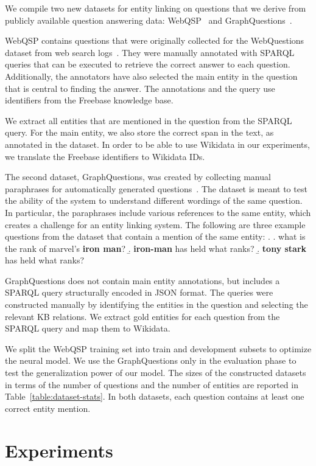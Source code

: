 \documentclass[11pt,a4paper]{article}
\begin{document}
We compile two new datasets for entity linking on questions that we derive from publicly available question answering data: WebQSP~\cite{Yih2016} and GraphQuestions~\cite{Su2016}.

WebQSP contains questions that were originally collected for the WebQuestions dataset from web search logs~\cite{Berant2013}. They were manually annotated with SPARQL queries that can be executed to retrieve the correct answer to each question. Additionally, the annotators have also selected the main entity in the question that is central to finding the answer. The annotations and the query use identifiers from the Freebase knowledge base.

We extract all entities that are mentioned in the question from the SPARQL query. For the main entity, we also store the correct span in the text, as annotated in the dataset. In order to be able to use Wikidata in our experiments, we translate the Freebase identifiers to Wikidata IDs.

The second dataset, GraphQuestions, was created by collecting manual paraphrases for automatically generated questions~\cite{Su2016}. The dataset is meant to test the ability of the system to understand different wordings of the same question. In particular, the paraphrases include various references to the same entity, which creates a challenge for an entity linking system. 
 The following are three example questions from the dataset that contain a mention of the same entity:
 \ex. \a. \label{ex:graphquestions} what is the rank of marvel's \textbf{iron man}?
 \b. \textbf{iron-man} has held what ranks?
 \b. \textbf{tony stark} has held what ranks?


GraphQuestions does not contain main entity annotations, but includes a SPARQL query structurally encoded in JSON format. The queries were constructed manually by identifying the entities in the question and selecting the relevant KB relations.  We extract gold entities for each question from the SPARQL query and map them to Wikidata. 

We split the WebQSP training set into train and development subsets to optimize the neural model. We use the GraphQuestions only in the evaluation phase to test the generalization power of our model. 
The sizes of the constructed datasets in terms of the number of questions and the number of entities are reported in Table~\ref{table:dataset-stats}. In both datasets, each question contains at least one correct entity mention.


\section{Experiments}
\end{document}
